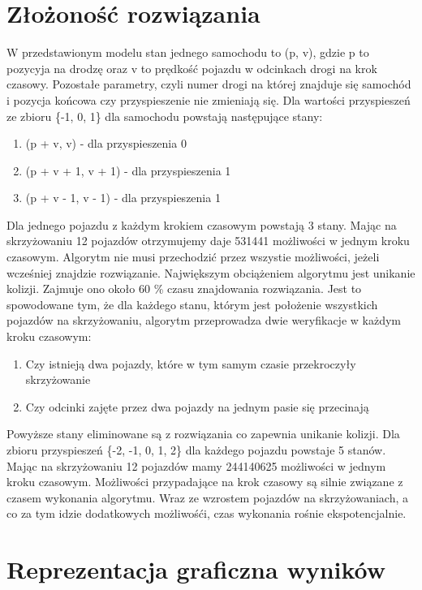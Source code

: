 \section{Złożoność rozwiązania}

W przedstawionym modelu stan jednego samochodu to (p, v), gdzie p to pozycyja na drodzę oraz v to prędkość pojazdu w odcinkach drogi na krok czasowy. Pozostałe parametry, czyli numer drogi na której znajduje się samochód i pozycja końcowa czy przyspieszenie nie zmieniają się. Dla wartości przyspieszeń ze zbioru \{-1, 0, 1\} dla samochodu powstają następujące stany:
\begin{enumerate}
\item (p + v, v) - dla przyspieszenia 0
\item (p + v + 1, v + 1) - dla przyspieszenia 1
\item (p + v - 1, v - 1) - dla przyspieszenia 1
\end{enumerate}
Dla jednego pojazdu z każdym krokiem czasowym powstają 3 stany. Mając na skrzyżowaniu 12 pojazdów otrzymujemy daje 531441 możliwości w jednym kroku czasowym. Algorytm nie musi przechodzić przez wszystie możliwości, jeżeli wcześniej znajdzie rozwiązanie.
\newline
\indent
Największym obciążeniem algorytmu jest unikanie kolizji. Zajmuje ono około 60 \% czasu znajdowania rozwiązania. Jest to spowodowane tym, że dla każdego stanu, którym jest położenie wszystkich pojazdów na skrzyżowaniu, algorytm przeprowadza dwie weryfikacje w każdym kroku czasowym:
\begin{enumerate}
\item Czy istnieją dwa pojazdy, które w tym samym czasie przekroczyły skrzyżowanie
\item Czy odcinki zajęte przez dwa pojazdy na jednym pasie się przecinają
\end{enumerate}
Powyższe stany eliminowane są z rozwiązania co zapewnia unikanie kolizji.
\newline
\indent
Dla zbioru przyspieszeń \{-2, -1, 0, 1, 2\} dla każdego pojazdu powstaje 5 stanów. Mając na skrzyżowaniu 12 pojazdów mamy 244140625 możliwości w jednym kroku czasowym. Możliwości przypadające na krok czasowy są silnie związane z czasem wykonania algorytmu. Wraz ze wzrostem pojazdów na skrzyżowaniach, a co za tym idzie dodatkowych możliwośći, czas wykonania rośnie ekspotencjalnie.
\section{Reprezentacja graficzna wyników}

